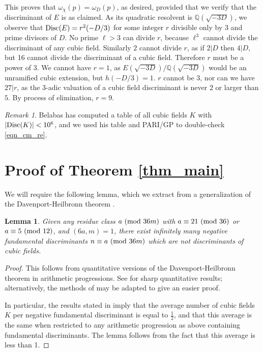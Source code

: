 \documentclass[12pt]{amsart}
\newtheorem{lemma}[theorem]{Lemma}
\theoremstyle{remark}
\newtheorem*{remark}{Remark}
\numberwithin{theorem}{section} \numberwithin{equation}{section}
\newcommand{\Q}{\mathbb{Q}}
\newcommand{\textmod}{{\text {\rm mod}}}
\newcommand{\Disc}{\textnormal{Disc}}
\begin{document}
This proves that $\omega_{\chi}(p) = \omega_D(p)$, as desired, provided that we verify that the discriminant of $E$ is as claimed. As its quadratic resolvent is
$\Q(\sqrt{-3D})$, we observe that  $\Disc(E) = r^2 (-D/3)$ for some integer $r$ divisible only by $3$ and prime divisors of $D$.
No prime $\ell > 3$ can divide $r$, because $\ell^3$ cannot divide the discriminant of any cubic field. Similarly $2$
cannot divide $r$, as if $2 | D$ then $4 | D$, but 16 cannot divide the discriminant of a cubic field. Therefore $r$ must
be a power of 3. We cannot have $r = 1$, as $E(\sqrt{-3D})/\Q(\sqrt{-3D})$ would be an unramified cubic extension,
but $h(-D/3) = 1$. $r$ cannot be $3$, nor can we have $27 | r$, as the $3$-adic valuation of a cubic field discriminant
is never $2$ or larger than $5$. By process of elimination, $r = 9$.

\begin{remark}
Belabas \cite{bel} has computed a table of all cubic fields $K$ with $|\Disc(K)| < 10^6$, and
we used his table and PARI/GP \cite{pari} to double-check \eqref{eqn_cm_re}. 
\end{remark}

\section{Proof of Theorem \ref{thm_main}}
We will require the following lemma, which we extract from a generalization of the Davenport-Heilbronn theorem \cite{DH}.
\begin{lemma}\label{lem_dh}
Given any residue class $a \ (\textmod \ 36m)$ with $a \equiv 21 \ (\textmod \ 36)$ or $a \equiv 5 \ (\textmod \ 12)$, and $(6a, m) = 1$, 
there exist infinitely many negative fundamental discriminants $n \equiv a \ (\textmod \ 36m)$ which are not discriminants of cubic fields.
\end{lemma}
\begin{proof}
This follows from quantitative versions of the Davenport-Heilbronn theorem in arithmetic progressions. See \cite{TT}
for sharp quantitative results; alternatively, the methods of \cite{HN} may be adapted to give an easier proof.

In particular, the results stated in \cite{TT} imply that the average number of cubic fields $K$ per negative fundamental discriminant
is equal to $\frac{1}{2}$, and that this average is the same when restricted to any arithmetic progression as above
containing fundamental
discriminants. The lemma follows from the fact that this average is less than 1.
\end{proof}
\end{document}
